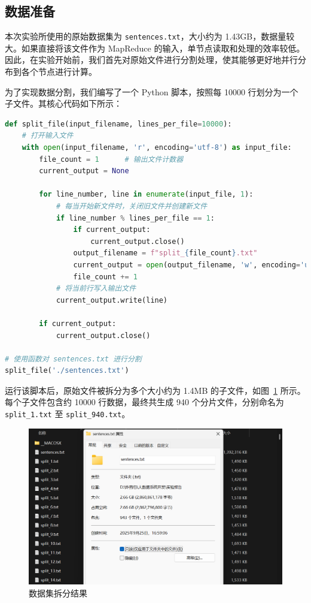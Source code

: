 \documentclass[]{bitreport}
\begin{document}
\subsection{数据准备}
本次实验所使用的原始数据集为 \texttt{sentences.txt}，大小约为 1.43GB，数据量较大。如果直接将该文件作为 MapReduce 的输入，单节点读取和处理的效率较低。因此，在实验开始前，我们首先对原始文件进行分割处理，使其能够更好地并行分布到各个节点进行计算。

为了实现数据分割，我们编写了一个 Python 脚本，按照每 10000 行划分为一个子文件。其核心代码如下所示：

\begin{lstlisting}[language=Python, caption={文件分割脚本}]
def split_file(input_filename, lines_per_file=10000):
    # 打开输入文件
    with open(input_filename, 'r', encoding='utf-8') as input_file:
        file_count = 1      # 输出文件计数器
        current_output = None
        
        for line_number, line in enumerate(input_file, 1):
            # 每当开始新文件时，关闭旧文件并创建新文件
            if line_number % lines_per_file == 1:
                if current_output:
                    current_output.close()
                output_filename = f"split_{file_count}.txt"
                current_output = open(output_filename, 'w', encoding='utf-8')
                file_count += 1
            # 将当前行写入输出文件
            current_output.write(line)
        
        if current_output:
            current_output.close()

# 使用函数对 sentences.txt 进行分割
split_file('./sentences.txt')
\end{lstlisting}

运行该脚本后，原始文件被拆分为多个大小约为 1.4MB 的子文件，如图~\ref{fig:splitfiles} 所示。每个子文件包含约 10000 行数据，最终共生成 940 个分片文件，分别命名为 \texttt{split\_1.txt} 至 \texttt{split\_940.txt}。

\begin{figure}[H]
  \centering
  \includegraphics[width=0.9\linewidth]{figures/Step1_FileSplit.png}
  \caption{数据集拆分结果}
  \label{fig:splitfiles}
\end{figure}
\end{document}
